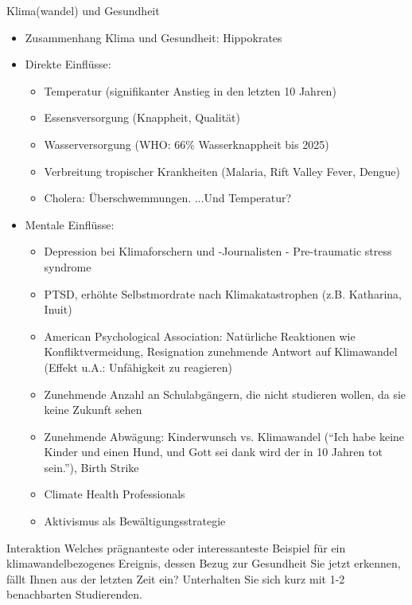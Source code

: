 \begin{frame}{Klima(wandel) und Gesundheit}
	\begin{itemize}
		\item Zusammenhang Klima und Gesundheit: Hippokrates
		\item Direkte Einflüsse:
		\begin{itemize}
			\item Temperatur (signifikanter Anstieg in den letzten 10 Jahren)
			\item Essensversorgung (Knappheit, Qualität)
			\item Wasserversorgung (WHO: 66$\%$ Wasserknappheit bis 2025)
			\item Verbreitung tropischer Krankheiten (Malaria, Rift Valley Fever, Dengue)
			\item Cholera: Überschwemmungen. ...Und Temperatur? 
		\end{itemize}
		\item Mentale Einflüsse:
		\begin{itemize}
			\item Depression bei Klimaforschern und -Journalisten - Pre-traumatic stress syndrome
			\item PTSD, erhöhte Selbstmordrate nach Klimakatastrophen (z.B. Katharina, Inuit)
			\item American Psychological Association: Natürliche Reaktionen wie Konfliktvermeidung, Resignation zunehmende Antwort auf Klimawandel (Effekt u.A.: Unfähigkeit zu reagieren)
			\item Zunehmende Anzahl an Schulabgängern, die nicht studieren wollen, da sie keine Zukunft sehen
			\item Zunehmende Abwägung: Kinderwunsch vs. Klimawandel (``Ich habe keine Kinder und einen Hund, und Gott sei dank wird der in 10 Jahren tot sein.''), Birth Strike
			\item Climate Health Professionals
			\item Aktivismus als Bewältigungsstrategie
		\end{itemize}
	\end{itemize}
\end{frame}

\begin{frame}{Interaktion}
	Welches prägnanteste oder interessanteste Beispiel für ein klimawandelbezogenes Ereignis, dessen Bezug zur Gesundheit Sie jetzt erkennen, fällt Ihnen aus der letzten Zeit ein? Unterhalten Sie sich kurz mit 1-2 benachbarten Studierenden. 
\end{frame}

